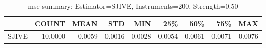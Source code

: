 \begin{table}[ht]
\centering
\caption{mse summary: Estimator=SJIVE, Instruments=200, Strength=0.50}
\begin{tabular}{lrrrrrrrr}
\toprule
 & COUNT & MEAN & STD & MIN & 25\% & 50\% & 75\% & MAX \\
\midrule
SJIVE & 10.0000 & 0.0059 & 0.0016 & 0.0028 & 0.0054 & 0.0061 & 0.0071 & 0.0076 \\
\bottomrule
\end{tabular}
\end{table}
